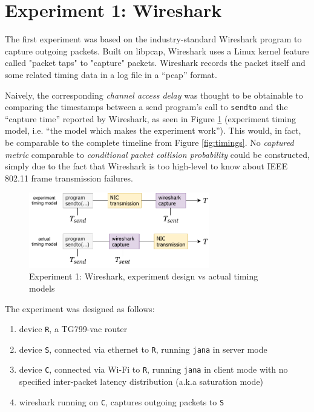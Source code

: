 \section{Experiment 1: Wireshark}


The first experiment was based on the industry-standard Wireshark program to
capture outgoing packets. Built on libpcap, Wireshark uses a Linux kernel
feature called "packet taps" to "capture" packets. Wireshark records the
packet itself and some related timing data in a log file in a ``pcap'' format.

Naively, the corresponding \emph{channel access delay} was thought to be
obtainable to comparing the timestamps between a send program's call to
\texttt{sendto} and the ``capture time'' reported by Wireshark, as seen in
Figure \ref{fig:wstiming} (experiment timing model, i.e. ``the model which
makes the experiment work''). This would, in fact, be comparable to the
complete timeline from Figure \ref{fig:timings}. No \emph{captured metric}
comparable to \emph{conditional packet collision probability} could be
constructed, simply due to the fact that Wireshark is too high-level to know
about IEEE 802.11 frame transmission failures.

\begin{figure}
\center
\includegraphics[width=0.7\textwidth]{images/wireshark-experiment-overview.pdf}
\caption{Experiment 1: Wireshark, experiment design vs actual timing models}
\label{fig:wstiming}
\end{figure}

The experiment was designed as follows:

\begin{enumerate}
  \item device \texttt{R}, a TG799-vac router
	\item device \texttt{S}, connected via ethernet to \texttt{R}, running \texttt{jana} in server mode
	\item device \texttt{C}, connected via Wi-Fi to \texttt{R}, running \texttt{jana} in client mode with
  no specified inter-packet latency distribution (a.k.a saturation mode)
	\item wireshark running on \texttt{C}, captures outgoing packets to \texttt{S}
\end{enumerate}

